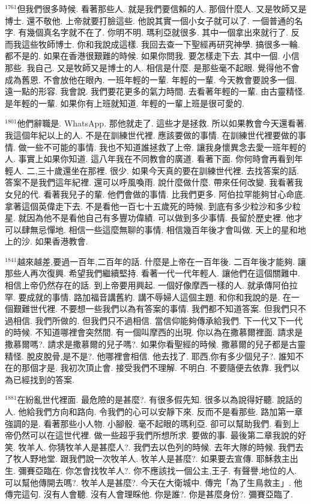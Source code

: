 \documentclass{book}
\begin{document}
$^{1761}$但我們很多時候.
看著那些人.
就是我們要信賴的人.
那個什麼人.
又是牧師又是博士.
還不敬他.
上帝就要打臉這些.
他說其實一個小女子就可以了.
一個普通的名字.
有幾個真名字就不在了.
你明不明.
瑪利亞就很多.
其中一個拿出來就行了.
反而我這些牧師博士.
你和我說成這樣.
我回去查一下聖經再研究神學.
搞很多一輪.
都不是的.
如果在香港很艱難的時候.
如果你問我.
要怎樣走下去.
其中一個.
小信那些.
我自己.
又是牧師又是博士的人.
相信是什麼.
是那些毫不起眼.
覺得他不會成為舊恩.
不會放他在眼內.
一班年輕的一輩.
年輕的一輩.
今天教會要說多一個.
遠一點的形容.
我會說.
我們要花更多的氣力時間.
去看著年輕的一輩.
由古靈精怪.
是年輕的一輩.
如果你有上班就知道.
年輕的一輩上班是很可愛的.

$^{1801}$他們辭職是.
WhatsApp.
那他就走了.
這些才是拯救.
所以如果教會今天還看著.
我這個年紀以上的人.
不是在訓練世代裡.
應該要做的事情.
在訓練世代裡要做的事情.
做一些不可能的事情.
我也不知道誰拯救了上帝.
讓我身懷異念去愛一班年輕的人.
事實上如果你知道.
這八年我在不同教會的廣道.
看著下面.
你何時會再看到年輕人.
二,三十歲還坐在那裡.
很少.
如果今天真的要在訓練世代裡.
去找答案的話.
答案不是我們這年紀裡.
還可以呼風喚雨.
說什麼做什麼.
帶來任何改變.
我看著我女兒的代.
看著我兒子的輩.
他們會做的事情.
比我們更多.
阿伯拉罕能夠甘心命底.
拿著這個英偉走下去.
不是看他一百七十五歲死的時候.
到底有多少粒沙和多少粒星.
就因為他不是看他自己有多豐功偉績.
可以做到多少事情.
長留於歷史裡.
他才可以肆無忌憚地.
相信一些這麼無聊的事情.
相信幾百年後才會叫做.
天上的星和地上的沙.
如果香港教會.

$^{1841}$越來越差,要過一百年,二百年的話.
什麼是上帝在一百年後.
二百年後才能夠.
讓那些人再次復興.
希望我們繼續堅持.
看著一代一代年輕人.
讓他們在這個關難中.
相信上帝仍然存在的話.
到上帝要用興起.
一個好像摩西一樣的人.
就承傳阿伯拉罕.
要成就的事情.
路加福音講舊約.
講不辱婦人這個主題.
和你和我說的是.
在一個艱難世代裡.
不要想一些我們以為有答案的事情.
我們都不知道答案.
但我們只不過相信.
我們所做的.
但我們只不過相信.
當信仰能夠傳承給我們.
下一代又下一代的時候.
不知道哪裡會突然間.
有一個叫摩西的出現.
你以為在撒慕爾裡面.
請求是撒慕爾嗎?.
請求是撒慕爾的兒子嗎?.
如果你看聖經的時候.
撒慕爾的兒子都是古靈精怪.
脫皮脫骨,是不是?.
他哪裡會相信.
他去找了.
耶西,你有多少個兒子?.
誰知不在的那個才是.
我初次頂止會.
接受我們不理解.
不明白.
不要隨便去依靠.
我們以為已經找到的答案.

$^{1881}$在紛亂世代裡面.
最危險的是甚麼?.
有很多假先知.
很多以為說得好聽.
說話的人.
他給我們方向和路向.
令我們的心可以安靜下來.
反而不是看那些.
路加第一章強調的是.
看著那些小人物.
小腳骰.
毫不起眼的瑪利亞.
卻可以幫助我們.
看到上帝仍然可以在這世代裡.
做一些超乎我們所想所求.
要做的事.
最後第二章我說的好笑.
牧羊人.
你猜牧羊人是甚麼人?.
我們去以色列的時候.
去年大隊的時候.
我們去了牧人野地堂.
跟我們說一次牧羊人.
牧羊人是甚麼?.
如果要去宣傳.
耶穌救主出生.
彌賽亞臨在.
你怎會找牧羊人?.
你不應該找一個公主,王子.
有聲譽,地位的人.
可以幫他傳開去嗎?.
牧羊人是甚麼?.
今天在大衛城中.
傳完「為了生鳥救主」.
他傳完這句.
沒有人會聽.
沒有人會理睬他.
你是誰?.
你是甚麼身份?.
彌賽亞臨了.
\end{document}
